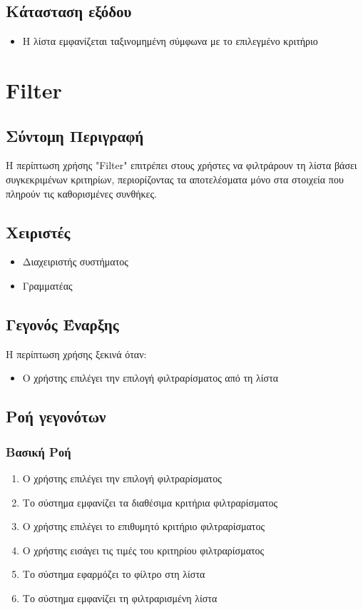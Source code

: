 \documentclass[12pt,a4paper,twoside]{book}
\begin{document}
\subsection{Κάτασταση εξόδου} %
\begin{itemize}
  \item Η λίστα εμφανίζεται ταξινομημένη σύμφωνα με το επιλεγμένο κριτήριο
\end{itemize}

\section{Filter}

\subsection{Σύντομη Περιγραφή}
Η περίπτωση χρήσης "Filter" επιτρέπει στους χρήστες να φιλτράρουν τη λίστα βάσει συγκεκριμένων κριτηρίων, περιορίζοντας τα αποτελέσματα μόνο στα στοιχεία που πληρούν τις καθορισμένες συνθήκες. %

\subsection{Χειριστές}
\begin{itemize}
  \item Διαχειριστής συστήματος
  \item Γραμματέας
\end{itemize}

\subsection{Γεγονός Έναρξης}
Η περίπτωση χρήσης ξεκινά όταν:
\begin{itemize}
  \item Ο χρήστης επιλέγει την επιλογή φιλτραρίσματος από τη λίστα %
\end{itemize}

\subsection{Ροή γεγονότων}

\subsubsection{Βασική Ροή}
\begin{enumerate}
  \item Ο χρήστης επιλέγει την επιλογή φιλτραρίσματος
  \item Το σύστημα εμφανίζει τα διαθέσιμα κριτήρια φιλτραρίσματος%
  \item Ο χρήστης επιλέγει το επιθυμητό κριτήριο φιλτραρίσματος
  \item Ο χρήστης εισάγει τις τιμές του κριτηρίου φιλτραρίσματος
  \item Το σύστημα εφαρμόζει το φίλτρο στη λίστα
  \item Το σύστημα εμφανίζει τη φιλτραρισμένη λίστα
\end{enumerate}
\end{document}
